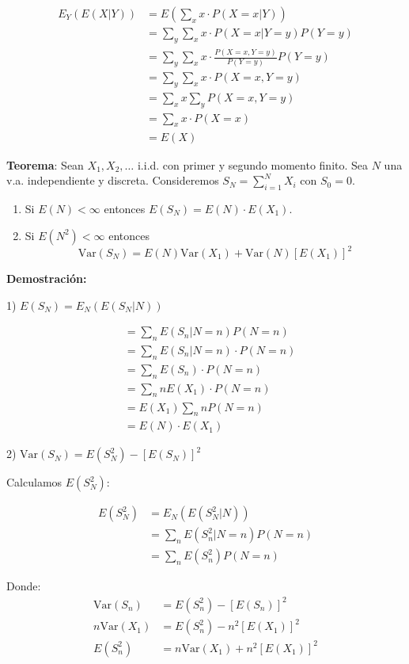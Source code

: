 \documentclass[12pt,a4paper]{article}
\newcommand{\teorema}[1]{%
\begin{teoremabox}
\textbf{Teorema}: #1
\end{teoremabox}
}
\begin{document}
\begin{align*}
E_Y(E(X|Y)) &= E\left(\sum_x x \cdot P(X=x|Y)\right) \\
&= \sum_y \sum_x x \cdot P(X=x|Y=y) P(Y=y) \\
&= \sum_y \sum_x x \cdot \frac{P(X=x, Y=y)}{P(Y=y)} P(Y=y) \\
&= \sum_y \sum_x x \cdot P(X=x, Y=y) \\
&= \sum_x x \sum_y P(X=x, Y=y) \\
&= \sum_x x \cdot P(X=x) \\
&= E(X)
\end{align*}

\teorema{Sean $X_1, X_2, \ldots$ i.i.d. con primer y segundo momento finito. Sea $N$ una v.a. independiente y discreta. Consideremos $S_N = \sum_{i=1}^{N} X_i$ con $S_0 = 0$.
\begin{enumerate}
\item Si $E(N) < \infty$ entonces $E(S_N) = E(N) \cdot E(X_1)$.
\item Si $E(N^2) < \infty$ entonces 
\begin{equation*}
\text{Var}(S_N) = E(N) \text{Var}(X_1) + \text{Var}(N) [E(X_1)]^2
\end{equation*}
\end{enumerate}}

\textbf{Demostración:}

1) $E(S_N) = E_N(E(S_N|N))$

\begin{align*}
&= \sum_n E(S_n|N=n) P(N=n) \\
&= \sum_n E(S_n|N=n) \cdot P(N=n) \\
&= \sum_n E(S_n) \cdot P(N=n) \\
&= \sum_n n E(X_1) \cdot P(N=n) \\
&= E(X_1) \sum_n n P(N=n) \\
&= E(N) \cdot E(X_1)
\end{align*}

2) $\text{Var}(S_N) = E(S_N^2) - [E(S_N)]^2$

Calculamos $E(S_N^2)$:

\begin{align*}
E(S_N^2) &= E_N(E(S_N^2|N)) \\
&= \sum_n E(S_n^2|N=n) P(N=n) \\
&= \sum_n E(S_n^2) P(N=n)
\end{align*}

Donde:
\begin{align*}
\text{Var}(S_n) &= E(S_n^2) - [E(S_n)]^2 \\
n\text{Var}(X_1) &= E(S_n^2) - n^2[E(X_1)]^2 \\
E(S_n^2) &= n\text{Var}(X_1) + n^2[E(X_1)]^2
\end{align*}
\end{document}
